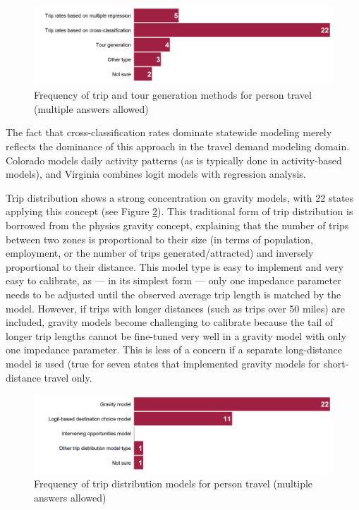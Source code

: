 \begin{figure}  %
\centering
\includegraphics[width=6.4in]{graphics/07-person-generation-methods}
\caption[Frequency of trip and tour generation methods for person travel]{Frequency of trip and tour generation methods for person travel (multiple answers allowed)}
\label{fig:person-generation-methods}
\end{figure}

The fact that cross-classification rates dominate statewide modeling merely reflects the dominance of this approach in the travel demand modeling domain. Colorado models daily activity patterns (as is typically done in activity-based models), and Virginia combines logit models with regression analysis.

Trip distribution shows a strong concentration on gravity models, with 22 states applying this concept (see Figure \ref{fig:person-distribution-models}). This traditional form of trip distribution is borrowed from the physics gravity concept, explaining that the number of trips between two zones is proportional to their size (in terms of population, employment, or the number of trips generated/attracted) and inversely proportional to their distance. This model type is easy to implement and very easy to calibrate, as --- in its simplest form --- only one impedance parameter needs to be adjusted until the observed average trip length is matched by the model. However, if trips with longer distances (such as trips over 50 miles) are included, gravity models become challenging to calibrate because the tail of longer trip lengths cannot be fine-tuned very well in a gravity model with only one impedance parameter. This is less of a concern if a separate long-distance model is used (true for seven states that implemented gravity models for short-distance travel only.

\begin{figure}  %
\centering
\includegraphics[width=6.4in]{graphics/08-person-distribution-models}
\caption[Frequency of trip distribution models for person travel]{Frequency of trip distribution models for person travel (multiple answers allowed)}
\label{fig:person-distribution-models}
\end{figure}

